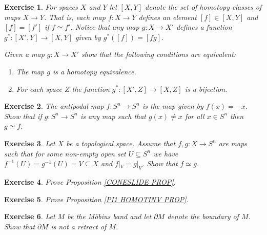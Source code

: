 \documentclass[11pt, letterpaper, oneside]{report}
\theoremstyle{pplain}
\theoremstyle{ddefinition}
\theoremstyle{nnn}
\theoremstyle{eexercise}
\newtheorem{exercise}{Exercise}[chapter]
\newcommand{\benu}{\begin{enumerate}}
\newcommand{\eenu}{\end{enumerate}}
\begin{document}
\begin{exercise}
For spaces $X$ and $Y$ let $[X, Y]$ denote the set of homotopy classes of maps $X \to Y$. That is, each map $f\colon X \to Y$
defines an element $[f]\in [X, Y]$ and $[f] = [f']$ if $f\simeq f'$. Notice that any map $g\colon X \to X'$ defines a function 
$g^{\ast}\colon [X', Y] \to [X, Y]$ given by $g^{\ast}([f]) = [fg]$.

Given a map $g\colon X \to X'$ show that the following conditions are equivalent:

\benu
\item[1)] The map $g$ is a homotopy equivalence. 

\item[2)] For each space $Z$ the function $g^{\ast}\colon [X', Z] \to [X, Z]$ is a bijection. 
\eenu

\end{exercise}






\begin{exercise}
The antipodal map  $f\colon S^{n} \to S^{n}$ is the map given by $f(x) = -x$. 
Show that if $g\colon S^{n}\to S^{n}$ is any map such that $g(x)\neq x$
for all $x\in S^{n}$ then $g\simeq f$. 
\end{exercise}




\begin{exercise}
Let $X$ be a topological  space. Assume that $f, g \colon X \to S^{n}$ are maps such that for some 
non-empty open set $U\subseteq S^{n}$ we have $f^{-1}(U) = g^{-1}(U) = V \subseteq X$  and 
$f|_{V} = g|_{V}$. Show that $f\simeq g$.  
\end{exercise}




\begin{exercise}
Prove Proposition \ref{CONESLIDE PROP}. 
\end{exercise}

 


\begin{exercise}
Prove Proposition \ref{PI1 HOMOTINV PROP}. 
\end{exercise}




\begin{exercise}
Let  $M$ be the M\"obius band and let $\partial M$ denote the boundary of $M$. 
Show that $\partial M$ is not a retract of $M$. 
\end{exercise}
\end{document}
